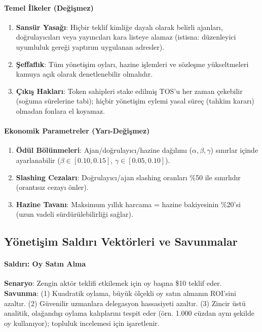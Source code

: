 \documentclass[11pt]{article}
\begin{document}
\begin{itemize}[noitemsep]
\begin{itemize}[noitemsep]
\begin{itemize}[noitemsep]
\begin{itemize}[noitemsep]
\begin{itemize}[noitemsep]
\begin{itemize}[noitemsep]
\begin{itemize}[noitemsep]
\begin{enumerate}[noitemsep]
\begin{itemize}[noitemsep]
\paragraph{Temel İlkeler (Değişmez)}
\begin{enumerate}[noitemsep]
  \item \textbf{Sansür Yasağı}: Hiçbir teklif kimliğe dayalı olarak belirli ajanları, doğrulayıcıları veya yayıncıları kara listeye alamaz (istisna: düzenleyici uyumluluk gereği yaptırım uygulanan adresler).
  \item \textbf{Şeffaflık}: Tüm yönetişim oyları, hazine işlemleri ve sözleşme yükseltmeleri kamuya açık olarak denetlenebilir olmalıdır.
  \item \textbf{Çıkış Hakları}: Token sahipleri stake edilmiş TOS'u her zaman çekebilir (soğuma sürelerine tabi); hiçbir yönetişim eylemi yasal süreç (tahkim kararı) olmadan fonlara el koyamaz.
\end{enumerate}

\paragraph{Ekonomik Parametreler (Yarı-Değişmez)}
\begin{enumerate}[noitemsep]
  \item \textbf{Ödül Bölünmeleri}: Ajan/doğrulayıcı/hazine dağılımı ($\alpha, \beta, \gamma$) sınırlar içinde ayarlanabilir ($\beta \in [0.10, 0.15]$, $\gamma \in [0.05, 0.10]$).
  \item \textbf{Slashing Cezaları}: Doğrulayıcı/ajan slashing oranları \%50 ile sınırlıdır (orantısız cezayı önler).
  \item \textbf{Hazine Tavanı}: Maksimum yıllık harcama = hazine bakiyesinin \%20'si (uzun vadeli sürdürülebilirliği sağlar).
\end{enumerate}

\subsection{Yönetişim Saldırı Vektörleri ve Savunmalar}

\paragraph{Saldırı: Oy Satın Alma}
\textbf{Senaryo}: Zengin aktör teklifi etkilemek için oy başına \$10 teklif eder.\\
\textbf{Savunma}: (1) Kuadratik oylama, büyük ölçekli oy satın almanın ROI'sini azaltır. (2) Güvenilir uzmanlara delegasyon hassasiyeti azaltır. (3) Zincir üstü analitik, olağandışı oylama kalıplarını tespit eder (örn. 1.000 cüzdan aynı şekilde oy kullanıyor); topluluk incelemesi için işaretlenir.


\end{itemize}
\end{enumerate}
\end{itemize}
\end{itemize}
\end{itemize}
\end{itemize}
\end{itemize}
\end{itemize}
\end{itemize}
\end{document}
